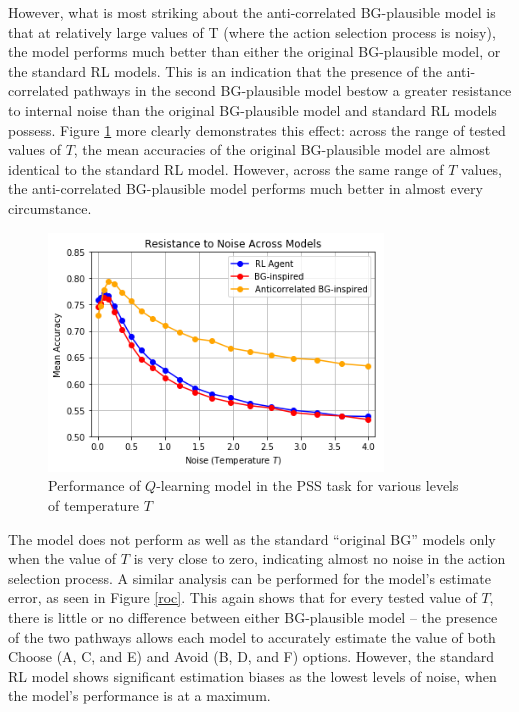 \documentclass[10pt,letterpaper]{article}
\begin{document}
However, what is most striking about the anti-correlated BG-plausible model is that at relatively large values of T (where the action selection process is noisy), the model performs much better than either the original BG-plausible model, or the standard RL models. This is an indication that the presence of the anti-correlated pathways in the second BG-plausible model bestow a greater resistance to internal noise than the original BG-plausible model and standard RL models possess. Figure \ref{resistance-to-noise} more clearly demonstrates this effect: across the range of tested values of $T$, the mean accuracies of the original BG-plausible model are almost identical to the standard RL model. However, across the same range of $T$ values, the anti-correlated BG-plausible model performs much better in almost every circumstance.

\begin{figure}[ht]
	\begin{center}
		\includegraphics[width=3.5in]{resistance-to-noise.png}
	\end{center}
	\caption{Performance of $Q$-learning model in the PSS task for various levels of temperature $T$} 
	\label{resistance-to-noise}
\end{figure}

The model does not perform as well as the standard ``original BG'' models only when the value of $T$ is very close to zero, indicating almost no noise in the action selection process. A similar analysis can be performed for the model's estimate error, as seen in Figure \ref{roc}. This again shows that for every tested value of $T$, there is little or no difference between either BG-plausible model – the presence of the two pathways allows each model to accurately estimate the value of both Choose (A, C, and E) and Avoid (B, D, and F) options. However, the standard RL model shows significant estimation biases as the lowest levels of noise, when the model’s performance is at a maximum.
\end{document}
